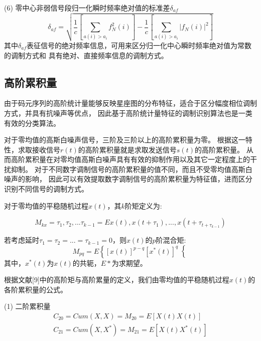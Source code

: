 (6) 零中心非弱信号段归一化瞬时频率绝对值的标准差$\delta_{af}$
\begin{equation}
\label{eqt_4_7}
\delta_{af} = \sqrt{\frac{1}{c}\left[\sum_{a(i)>a_i} f_N^2(i)\right]
	- \frac{1}{c}\left[\sum_{a(i)>a_i} \left|f_N(i)\right|^2\right]}
\end{equation}
其中$\delta_{af}$表征信号的绝对频率信息，可用来区分归一化中心瞬时频率绝对值为常数的调制方式和
具有绝对、直接频率信息的调制方式。

\subsection{高阶累积量}

由于码元序列的高阶统计量能够反映星座图的分布特征，适合于区分幅度相位调制方式，并具有抗噪声等优点，
因此基于高阶统计量特征的调制识别算法也是一类有效的分类算法\cite{张利2017基于高阶累积量的调制识别算法的研究}。\par

对于零均值的高斯白噪声信号，三阶及三阶以上的高阶累积量为零。
根据这一特性，求取接收信号$r(t)$的高阶累积量就是求取发送信号$s(t)$的高阶累积量。
从而高阶累积量在对零均值高斯白噪声具有有效的抑制作用以及其它一定程度上的干扰抑制。
对于不同数字调制信号的高阶累积量的值不同，而且不受零均值高斯白噪声的影响，
因此可以有效提取数字调制信号的高阶累积量为特征值，进而区分识别不同信号的调制方式。\par

对于零均值的平稳随机过程$x(t)$，其$k$阶矩定义为:\par
\begin{equation}
\label{eqt_4_8}
M_{kx} = \tau_1, \tau_2, ... \tau_{k-1} = E{x(t), x(t+\tau_1), ..., x(t+\tau_{t+\tau_{k-1}})}
\end{equation}

若考虑延时$\tau_1 = \tau_2 = ... = \tau_{k-1} = 0$，则$x(t)$的$p$阶混合矩:
\begin{equation}
\label{eqt_4_9}
M_{pq} = E\left\lbrace \left[ x(t)\right]^{p-q} 
\left[ x^*(t)\right]^{q}\right\lbrace 
\end{equation}
其中，$x^*(t)$为$x(t)$的共轭，$E{*}$为求期望。\par
根据文献[9]中的高阶矩与高阶累量的定义，我们由零均值的平稳随机过程$x(t)$的各阶累积量的公式。

(1) 二阶累积量
\begin{equation}
\label{eqt_4_10}
\begin{aligned}
C_{20} = Cum(X, X) = M_{20} = E[X(t)X(t)]\\
C_{21} = Cum(X, X^*) = M_{21} = E[X(t)X^*(t)]	
\end{aligned}
\end{equation}

